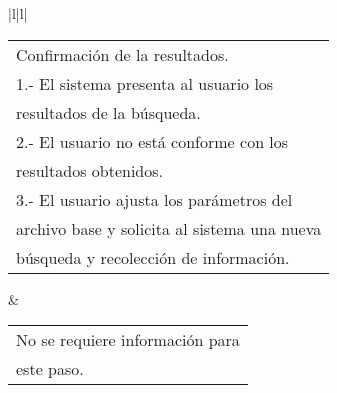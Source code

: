 \begin{longtable}{|l|l|}
                                                                                                                                                                                                                                                                                                                                                                                                                                                                                                                                     \\ \hline
\begin{tabular}[c]{@{}l@{}}Confirmación de la resultados.\\ 1.- El sistema presenta al usuario los\\ resultados de la búsqueda.\\ 2.- El usuario no está conforme con los\\ resultados obtenidos.\\ 3.- El usuario ajusta los parámetros del\\ archivo base y solicita al sistema una nueva\\ búsqueda y recolección de información.\end{tabular} & \begin{tabular}[c]{@{}l@{}}No se requiere información para\\ este paso.\end{tabular}                                                                                                                                                    \\ \hline
{}                                                                                                                                                                                                                                                                                                                                                                                                                                                                                               \\ \hline
{}                                                                                                                                                                                                                                                                                                                                                                                                                       \\ \hline

\end{longtable}
